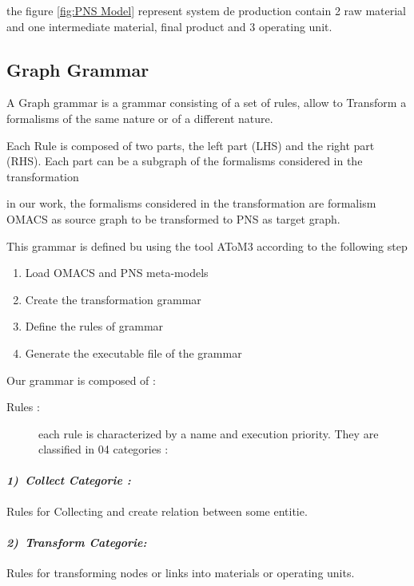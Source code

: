 the figure \ref{fig:PNS Model} represent system de production contain 2 raw material and one intermediate material, final product and 3 operating unit.





\pagebreak
\subsection{Graph Grammar}
A Graph grammar is a grammar consisting of a set of rules, allow to 
Transform a formalisms of the same nature or of a different nature. 

Each Rule is composed of two parts, the left part (LHS) and the right part (RHS).
Each part can be a subgraph of the formalisms considered in the transformation

in our work, the formalisms considered in the transformation are formalism
OMACS as source graph to be transformed to PNS as target graph.

This grammar is defined bu using the tool AToM3 according to the following step

\begin{enumerate}
	\item Load OMACS and PNS meta-models
	\item Create the transformation grammar
	\item Define the rules of grammar
	\item Generate the executable file of the grammar
\end{enumerate}

Our grammar is composed of :
\begin{description}
	\item [{Rules :}] each rule is characterized
	by a name and execution priority. They are classified in 04 categories :
\end{description}


\paragraph{\emph{1)~Collect Categorie :} } 
Rules for Collecting and create relation between some entitie.
 
\paragraph{\emph{2)~Transform Categorie:} } 
Rules for transforming nodes or links into materials or operating units.
 

